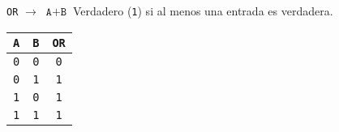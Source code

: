 \documentclass[aspectratio=169]{beamer}
\begin{document}
\begin{frame}[fragile,t]
\begin{textblock}{45}
\begin{block}{\texttt{OR} $\rightarrow$ \Large \textcolor{naranjauca}{ $\texttt{A}+\texttt{B}$ }}
    Verdadero (\texttt{1}) si al menos una entrada es verdadera. %
    \vspace{0.45cm} %
    \begin{center}
    \begin{tabular}{cc|c}
    \texttt{A} & \texttt{B} & \texttt{OR} \\
    \hline
    \texttt{0} & \texttt{0} & \texttt{0} \\
    \texttt{0} & \texttt{1} & \texttt{1} \\
    \texttt{1} & \texttt{0} & \texttt{1} \\
    \texttt{1} & \texttt{1} & \texttt{1} \\
    \end{tabular}
    \end{center}
    \end{block}
    \end{textblock}
\end{frame}
\end{document}
